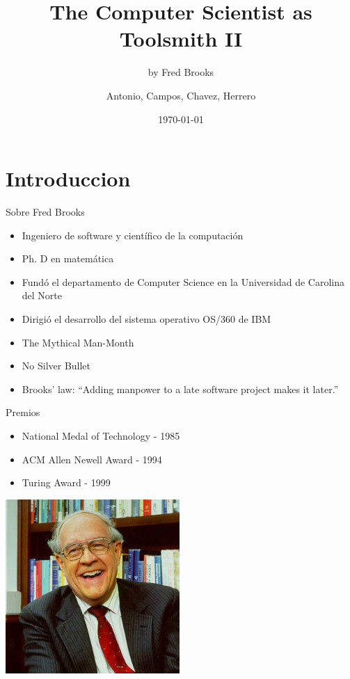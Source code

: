 \documentclass{beamer}
\title{The Computer Scientist as Toolsmith II}
\subtitle{by Fred Brooks}
\author{Antonio, Campos, Chavez, Herrero}
\institute{Ingeniería de Software II}
\date{\today}
\begin{document}
\begin{frame}
\titlepage
\end{frame}

\section{Introduccion}
\begin{frame}{Sobre Fred Brooks}

\begin{itemize}
\item Ingeniero de software y científico de la computación 
\item Ph. D en matemática
\item Fundó el departamento de Computer Science en la Universidad de Carolina del Norte
\item Dirigió el desarrollo del sistema operativo OS/360 de IBM
\item The Mythical Man-Month
\item No Silver Bullet
\item Brooks' law: ``Adding manpower to a late software project makes it later.''
\end{itemize}
\end{frame}

\begin{frame}{Premios}
\begin{itemize}
\item National Medal of Technology - 1985
\item ACM Allen Newell Award - 1994
\item Turing Award - 1999
\end{itemize}
\begin{center}
\includegraphics[height=.50\textheight]{Brooks.jpg}
\end{center}
\end{frame}
\end{document}
